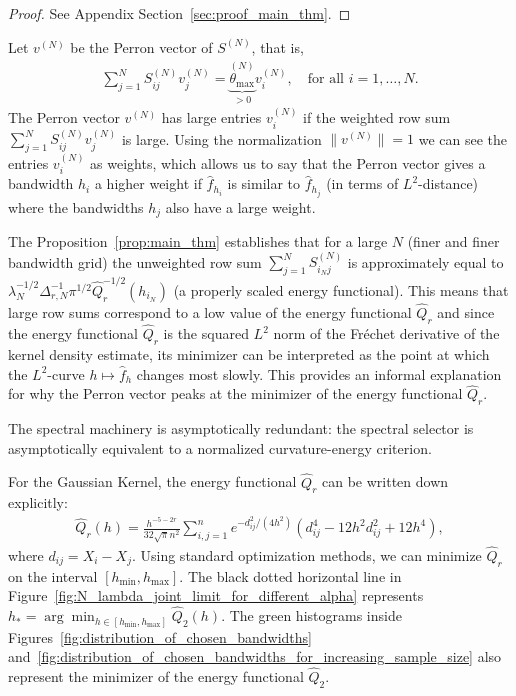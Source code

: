 \begin{proof}
    See Appendix Section~\ref{sec:proof_main_thm}.
\end{proof}

Let $v^{(N)}$ be the Perron vector of $S^{(N)}$, that is,
\begin{align*}
    \sum_{j=1}^{N}S_{ij}^{(N)}v_j^{(N)}=\underbrace{\theta_{\max}}_{>0}^{(N)}v_i^{(N)},\quad\text{for all }i=1,\dots,N.
\end{align*}
The Perron vector $v^{(N)}$ has large entries $v_i^{(N)}$ if the weighted row sum $\sum_{j=1}^{N}S_{ij}^{(N)}v_j^{(N)}$ is large. Using the normalization $\|v^{(N)}\|=1$ we can see the entries $v_i^{(N)}$ as weights, which allows us to say that the Perron vector gives a bandwidth $h_i$ a higher weight if $\hat{f}_{h_i}$ is similar to $\hat{f}_{h_j}$ (in terms of $L^2$-distance) where the bandwidths $h_j$ also have a large weight.

The Proposition~\ref{prop:main_thm} establishes that for a large $N$ (finer and finer bandwidth grid) the unweighted row sum $\sum_{j=1}^{N}S_{i_Nj}^{(N)}$ is approximately equal to $\lambda_N^{-1/2}\Delta_{r,N}^{-1}\pi^{1/2}\hat{Q}_r^{-1/2}(h_{i_N})$ (a properly scaled energy functional). This means that large row sums correspond to a low value of the energy functional $\hat{Q}_r$ and since the energy functional $\hat{Q}_r$ is the squared $L^2$ norm of the Fréchet derivative of the kernel density estimate, its minimizer can be interpreted as the point at which the $L^2$-curve $h\mapsto\hat{f}_h$ changes most slowly. This provides an informal explanation for why the Perron vector peaks at the minimizer of the energy functional $\hat{Q}_r$.

The spectral machinery is asymptotically redundant: the spectral selector is asymptotically equivalent to a normalized curvature-energy criterion.


For the Gaussian Kernel, the energy functional $\hat{Q}_r$ can be written down explicitly:
\begin{align*}
    \hat{Q}_r(h)=\frac{h^{-5-2r}}{32\sqrt{\pi}n^2}\sum_{i,j=1}^{n}e^{-d_{ij}^2/(4h^2)}\left(d_{ij}^4-12h^2d_{ij}^2+12h^4\right),
\end{align*}
where $d_{ij}=X_i-X_j$. Using standard optimization methods, we can minimize $\hat{Q}_r$ on the interval $[h_{\min},h_{\max}]$. The black dotted horizontal line in Figure~\ref{fig:N_lambda_joint_limit_for_different_alpha} represents $h_{\ast}=\arg\min_{h\in[h_{\min},h_{\max}]}\hat{Q}_2(h)$. The green histograms inside Figures~\ref{fig:distribution_of_chosen_bandwidths} and~\ref{fig:distribution_of_chosen_bandwidths_for_increasing_sample_size} also represent the minimizer of the energy functional $\hat{Q}_2$.

